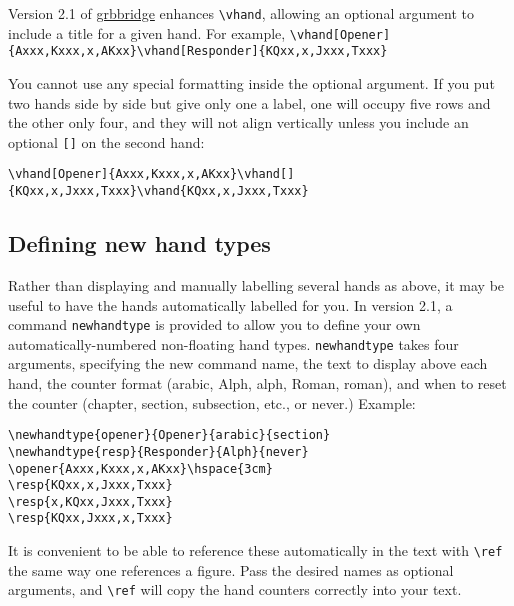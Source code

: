 \documentclass[10pt]{article}%
\newcommand{\gap}{\vspace{\baselineskip}}
\begin{document}
Version 2.1 of \url{grbbridge} enhances \verb+\vhand+, allowing an optional argument to include a title for a given hand. For example, \verb+\vhand[Opener]{Axxx,Kxxx,x,AKxx}\vhand[Responder]{KQxx,x,Jxxx,Txxx}+

\gap{} 

\gap You cannot use any special formatting inside the optional argument. If you put two hands side by side but give only one a label, one will occupy five rows and the other only four, and they will not align vertically unless you include an optional \verb+[]+ on the second hand:

\gap \verb+\vhand[Opener]{Axxx,Kxxx,x,AKxx}\vhand[]{KQxx,x,Jxxx,Txxx}\vhand{KQxx,x,Jxxx,Txxx}+


\gap

\subsection*{Defining new hand types}

Rather than displaying and manually labelling several hands as above, it may be useful to have the hands automatically labelled for you. In version 2.1, a command \verb+newhandtype+ is provided to allow you to define your own automatically-numbered non-floating hand types. \verb+newhandtype+ takes four arguments, specifying the new command name, the text to display above each hand, the counter format (arabic, Alph, alph, Roman, roman), and when to reset the counter (chapter, section, subsection, etc., or never.) Example: 

\begin{verbatim}
\newhandtype{opener}{Opener}{arabic}{section}
\newhandtype{resp}{Responder}{Alph}{never}
\opener{Axxx,Kxxx,x,AKxx}\hspace{3cm}
\resp{KQxx,x,Jxxx,Txxx}
\resp{x,KQxx,Jxxx,Txxx}
\resp{KQxx,Jxxx,x,Txxx}
\end{verbatim}

\hspace{3cm}

\gap 

It is convenient to be able to reference these automatically in the text with \verb+\ref+ the same way one references a figure. Pass the desired names as optional arguments, and \verb+\ref+ will copy the hand counters correctly into your text.
\end{document}
